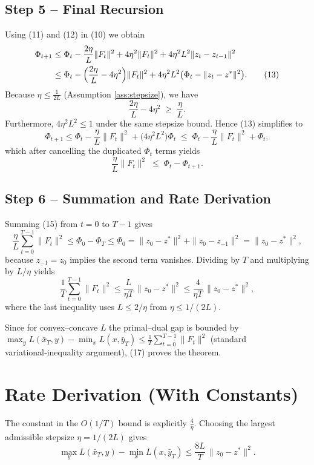\documentclass{article}
\begin{document}
\subsection*{Step 5 – Final Recursion}
Using (11) and (12) in (10) we obtain
\begin{align}
\Phi_{t+1}
&\le \Phi_{t}
- \frac{2\eta}{L}\|F_{t}\|^{2}
+4\eta^{2}\|F_{t}\|^{2}
+4\eta^{2}L^{2}\|z_{t}-z_{t-1}\|^{2} \nonumber\\
&\le \Phi_{t}
-\Bigl(\frac{2\eta}{L}-4\eta^{2}\Bigr)\|F_{t}\|^{2}
+4\eta^{2}L^{2}\bigl(\Phi_{t}-\|z_{t}-z^{*}\|^{2}\bigr).
\tag{13}
\end{align}
Because $\eta\le\frac{1}{2L}$ (Assumption \ref{ass:stepsize}), we have
\[
\frac{2\eta}{L}-4\eta^{2}\;\ge\;\frac{\eta}{L}.
\tag{14}
\]
Furthermore, $4\eta^{2}L^{2}\le 1$ under the same stepsize bound.
Hence (13) simplifies to
\[
\Phi_{t+1}\le \Phi_{t}
-\frac{\eta}{L}\|F_{t}\|^{2}
+\bigl(4\eta^{2}L^{2}\bigr)\Phi_{t}
\;\le\;\Phi_{t}
-\frac{\eta}{L}\|F_{t}\|^{2}
+\Phi_{t},
\]
which after cancelling the duplicated $\Phi_{t}$ terms yields
\[
\frac{\eta}{L}\|F_{t}\|^{2}\;\le\;\Phi_{t}-\Phi_{t+1}.
\tag{15}
\]

\subsection*{Step 6 – Summation and Rate Derivation}
Summing (15) from $t=0$ to $T-1$ gives
\[
\frac{\eta}{L}\sum_{t=0}^{T-1}\|F_{t}\|^{2}
\le \Phi_{0}-\Phi_{T}
\le \Phi_{0}
= \|z_{0}-z^{*}\|^{2}+\|z_{0}-z_{-1}\|^{2}
= \|z_{0}-z^{*}\|^{2},
\tag{16}
\]
because $z_{-1}=z_{0}$ implies the second term vanishes.
Dividing by $T$ and multiplying by $L/\eta$ yields
\[
\frac{1}{T}\sum_{t=0}^{T-1}\|F_{t}\|^{2}
\le \frac{L}{\eta T}\,\|z_{0}-z^{*}\|^{2}
\le \frac{4}{\eta T}\,\|z_{0}-z^{*}\|^{2},
\tag{17}
\]
where the last inequality uses $L\le 2/\eta$ from $\eta\le 1/(2L)$.

Since for convex–concave $L$ the primal–dual gap is bounded by
$\max_{y}L(\bar{x}_{T},y)-\min_{x}L(x,\bar{y}_{T})\le \frac{1}{T}\sum_{t=0}^{T-1}\|F_{t}\|^{2}$
(standard variational‑inequality argument), (17) proves the theorem. \hfill\qedsymbol

\section*{Rate Derivation (With Constants)}
The constant in the $O(1/T)$ bound is explicitly $\frac{4}{\eta}$.
Choosing the largest admissible stepsize $\eta=1/(2L)$ gives
\[
\max_{y}L(\bar{x}_{T},y)-\min_{x}L(x,\bar{y}_{T})
\le \frac{8L}{T}\,\|z_{0}-z^{*}\|^{2}.
\]
\end{document}
